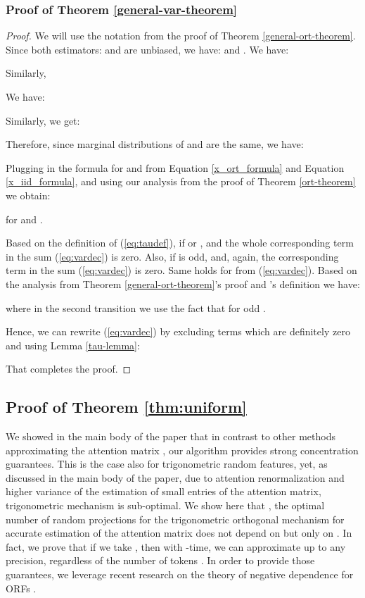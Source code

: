 \subsubsection{Proof of Theorem \ref{general-var-theorem}}
\begin{proof}
We will use the notation from the proof of Theorem \ref{general-ort-theorem}.
Since both estimators:  and
 are unbiased, we have:
 and
.
We have:


Similarly,


We have: 


Similarly, we get:


Therefore, since marginal distributions of  and  are the same,  we have:

Plugging in the formula for  and  from Equation \ref{x_ort_formula} and Equation \ref{x_iid_formula}, and using our analysis from the proof of Theorem \ref{ort-theorem} we obtain:

for  and .

Based on the definition of  (\ref{eq:taudef}), if  or ,  and the whole corresponding term in the sum (\ref{eq:vardec}) is zero. Also, if  is odd,  and, again, the corresponding term in the sum (\ref{eq:vardec}) is zero. Same holds for  from (\ref{eq:vardec}). Based on the analysis from Theorem \ref{general-ort-theorem}'s proof and 's definition we have:

where in the second transition we use the fact that  for odd .


Hence, we can rewrite (\ref{eq:vardec}) by excluding terms which are definitely zero and using Lemma \ref{tau-lemma}:

That completes the proof.
\end{proof}

\subsection{Proof of Theorem \ref{thm:uniform}}

We showed in the main body of the paper that in contrast to other methods approximating the attention matrix , our algorithm provides strong concentration guarantees. This is the case also for trigonometric random features, yet, as discussed in the main body of the paper, due to attention renormalization and higher variance of the estimation of small entries of the attention matrix, trigonometric mechanism is sub-optimal.
We show here that , the optimal number of random projections for the trigonometric orthogonal mechanism for accurate estimation of the attention matrix does not depend on  but only on . In fact, we prove that if we take , then with -time, we can approximate  up to any precision, regardless of the number of tokens . In order to provide those guarantees, we leverage recent research on the theory of negative dependence for ORFs \citep{Lin2020DemystifyingOM}.

